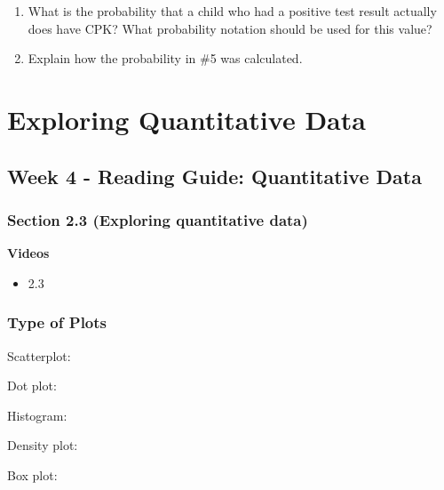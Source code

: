\documentclass[
]{report}
\providecommand{\tightlist}{%
  \setlength{\itemsep}{0pt}\setlength{\parskip}{0pt}}
\newcommand{\rgs}{\vspace{12pt}} %
\begin{document}
\begin{enumerate}
\def\labelenumi{\arabic{enumi}.}
\setcounter{enumi}{4}
\item
  What is the probability that a child who had a positive test result actually does have CPK? What probability notation should be used for this value?
  \rgs
\item
  Explain how the probability in \#5 was calculated.
\end{enumerate}

\newpage

\hypertarget{exploring-quantitative-data}{%
\chapter{Exploring Quantitative Data}\label{exploring-quantitative-data}}

\hypertarget{week-4---reading-guide-quantitative-data}{%
\section{Week 4 - Reading Guide: Quantitative Data}\label{week-4---reading-guide-quantitative-data}}


\hypertarget{section-2.3-exploring-quantitative-data}{%
\subsection*{Section 2.3 (Exploring quantitative data)}\label{section-2.3-exploring-quantitative-data}}

\textbf{Videos}

\begin{itemize}
\tightlist
\item
  2.3
\end{itemize}

\hypertarget{type-of-plots}{%
\subsection*{Type of Plots}\label{type-of-plots}}

Scatterplot:
\rgs

Dot plot:
\rgs

Histogram:
\rgs

Density plot:
\rgs

Box plot:
\rgs
\end{document}
